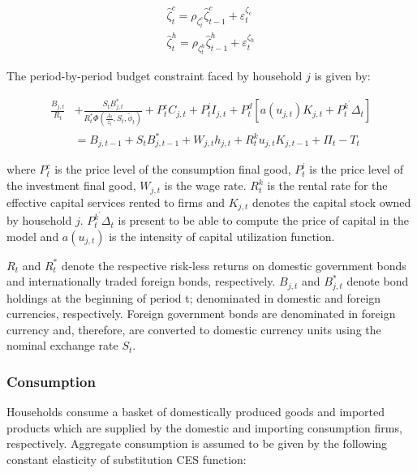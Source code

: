 \documentclass[12pt,oneside,a4paper]{article}
\begin{document}
\begin{equation}
    \begin{array}{l}
\widehat{\zeta}_{t}^{c}=\rho_{\zeta_{t}^{c}} \widehat{\zeta}_{t-1}^{c}+\varepsilon_{t}^{\zeta_c} \\
\widehat{\zeta}_{t}^{h}=\rho_{\zeta_{t}^{h}} \widehat{\zeta}_{t-1}^{h}+\varepsilon_{t}^{\zeta_h}
\end{array}
\end{equation}

The period-by-period budget constraint faced by household $j$ is given by:

\begin{equation}
    \begin{aligned}
    \frac{B_{j, t}}{R_{t}} &+\frac{S_{t} B_{j, t}^{*}}{R_{t}^{*} \Phi\left(\frac{A_{t}}{z_{t}}, S_{t}, \tilde{\phi}_{t}\right)}+P_{t}^{c} C_{j, t}+P_{t}^{i} I_{j, t}+P_{t}^{d}\left[a\left(u_{j, t}\right) K_{j, t}+P_{t}^{k^{\prime}} \Delta_{t}\right] \\
    &=B_{j, t-1}+S_{t} B_{j, t-1}^{*}+W_{j, t} h_{j, t}+R_{t}^{k} u_{j, t} K_{j, t-1}+\Pi_{t}-T_{t}
    \end{aligned}
\end{equation}

where $P_{t}^{c}$ is the price level of the consumption
final good, $P_{t}^{i}$ is the price level of the investment final good, $W_{j, t}$ is the wage rate. $R_{t}^{k}$ is the rental rate for the effective capital services rented to firms and $K_{j,t}$ denotes the capital stock owned by household $j$. $P_{t}^{k^{\prime}} \Delta_{t}$ is present to be able to compute the price of capital in the model and $a\left(u_{j, t}\right)$ is the intensity of capital utilization function.

$R_t$ and $R_t^{*}$ denote the respective risk-less returns on domestic government bonds and internationally traded
foreign bonds, respectively. $B_{j,t}$ and $B_{j,t}^{*}$ denote bond holdings at the beginning of period t; denominated in domestic and foreign currencies, respectively. Foreign government bonds are denominated in foreign currency and, therefore, are converted to domestic currency units using the nominal exchange rate $S_t$.
\subsubsection{Consumption}
Households consume a basket of domestically produced goods and imported products which are supplied by the domestic and importing consumption firms, respectively. Aggregate consumption is assumed to be given by the following constant elasticity of substitution CES function:
\end{document}
